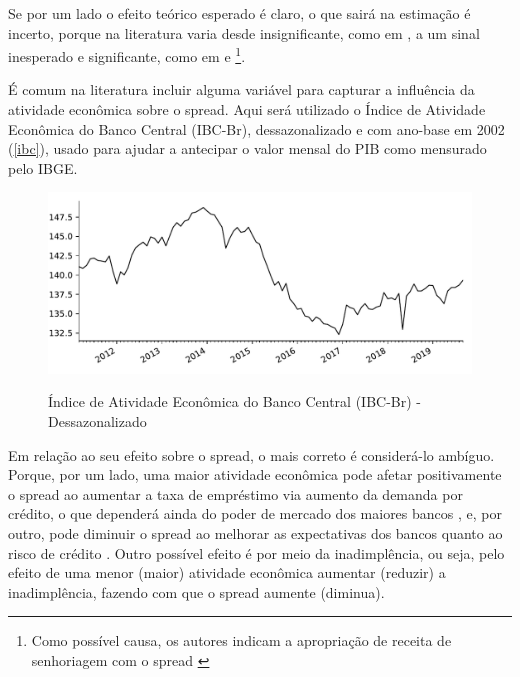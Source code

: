\documentclass[a4paper,
               article,
               12pt,
               openany,
               oneside,
               english,
               brazil]{abntex2}
\numberwithin{equation}{section}
\begin{document}
    Se por um lado o efeito teórico esperado é claro, o que sairá na estimação é incerto, porque na literatura varia desde insignificante, como em \textcite{oreiro}, a um sinal inesperado e significante, como em \textcite{bignotto06} e \textcite{afanasieff02}\footnote{Como possível causa, os autores indicam a apropriação de receita de senhoriagem com o spread \cite[p.~25]{afanasieff02}}.
    
    É comum na literatura incluir alguma variável para capturar a influência da atividade econômica sobre o spread. Aqui será utilizado o Índice de Atividade Econômica do Banco Central (IBC-Br), dessazonalizado e com ano-base em 2002 (\autoref{ibc}), usado para ajudar a antecipar o valor mensal do PIB como mensurado pelo IBGE.

    \begin{figure}[hbt]
        \centering
        \caption{Índice de Atividade Econômica do Banco Central (IBC-Br) - Dessazonalizado}
        \includegraphics[width = \textwidth, scale=0.75]{ibc.pdf}
        \label{ibc}
    \end{figure}

    Em relação ao seu efeito sobre o spread, o mais correto é considerá-lo ambíguo. Porque, por um lado, uma maior atividade econômica pode afetar positivamente o spread ao aumentar a taxa de empréstimo via aumento da demanda por crédito, o que dependerá ainda do poder de mercado dos maiores bancos \textcite[626]{oreiro}, e, por outro, pode diminuir o spread ao melhorar as expectativas dos bancos quanto ao risco de crédito \textcite[24]{chaim}. Outro possível efeito é por meio da inadimplência, ou seja, pelo efeito de uma menor (maior) atividade econômica aumentar (reduzir) a inadimplência, fazendo com que o spread aumente (diminua).
\end{document}
